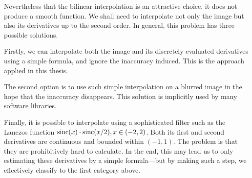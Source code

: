 Nevertheless that the bilinear interpolation is an attractive choice, it does not produce a smooth function.
We shall need to interpolate not only the image but also its derivatives up to the second order.
In general, this problem has three possible solutions.

Firstly, we can interpolate both the image and its discretely evaluated derivatives using a simple formula, and ignore the inaccuracy induced.
This is the approach applied in this thesis.

The second option is to use such simple interpolation on a blurred image in the hope that the inaccuracy disappears.
This solution is implicitly used by many software libraries.

Finally, it is possible to interpolate using a sophisticated filter such as the Lanczos function $\mathrm{sinc}(x) \cdot \mathrm{sinc}(x/2), x \in (-2, 2)$.
Both its first and second derivatives are continuous and bounded within $(-1, 1)$.
The problem is that they are prohibitively hard to calculate.
In the end, this may lead us to only estimating these derivatives by a simple formula---but by making such a step, we effectively classify to the first category above.
